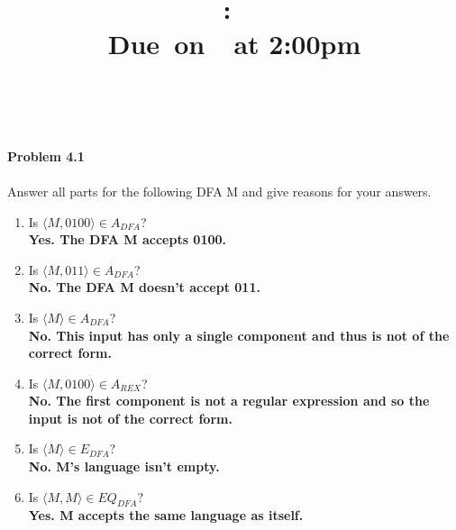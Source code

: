 \documentclass{article}
\title{
  \vspace{2in}
  \textmd{\textbf{\hmwkClass:\ \hmwkTitle}}\\
  \normalsize\vspace{0.1in}\small{Due\ on\ \hmwkDueDate\ at 2:00pm}\\
  \vspace{0.1in}\large{\textit{\hmwkClassInstructor\ \hmwkClassTime}}
  \vspace{3in}
}
\author{\textbf{\hmwkAuthorName}}
\date{}
\newcommand{\problem}[1]{\large{\textbf{Problem #1}}\\}
\begin{document}
\maketitle

\pagebreak

\problem{4.1} \\
Answer all parts for the following DFA M and give reasons for your answers.

{\centering
{}

}

\begin{enumerate}[1., leftmargin = 0.5cm]
\itemsep0em
\item Is $\langle M,0100 \rangle \in A_{DFA}$?\\
    \textbf{Yes. The DFA M accepts 0100.}
\item Is $\langle M,011 \rangle \in A_{DFA}$? \\
    \textbf{No. The DFA M doesn't accept 011.}
\item Is $\langle M \rangle \in A_{DFA}$? \\
    \textbf{No. This input has only a single component and thus is not of the correct form.}
\item Is $\langle M,0100 \rangle \in A_{REX}$? \\
    \textbf{No. The first component is not a regular expression and so the input is not of the correct form.}
\item Is $\langle M \rangle \in E_{DFA}$? \\
    \textbf{No. M's language isn't empty.}
\item Is $\langle M,M \rangle \in EQ_{DFA}$? \\
    \textbf{Yes. M accepts the same language as itself.} \\
\end{enumerate}
\end{document}
